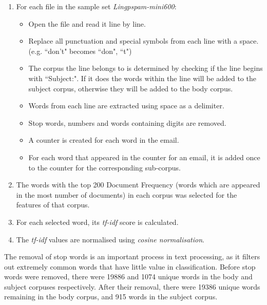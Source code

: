 \documentclass[10pt, a4paper]{article}
\begin{document}
\begin{enumerate}
\item For each file in the sample set \emph{Lingpspam-mini600}:
	\begin{itemize}
	\item Open the file and read it line by line.
	\item Replace all punctuation and special symbols from each line with a space. (e.g. ``don't" becomes ``don", ``t")
	\item The corpus the line belongs to is determined by checking if the line begins with ``Subject:". If it does the words within the line will be added to the subject corpus, otherwise they will be added to the body corpus.
	\item Words from each line are extracted using space as a delimiter.
	\item Stop words, numbers and words containing digits are removed.
	\item A counter is created for each word in the email.
	\item For each word that appeared in the counter for an email, it is added once to the counter for the corresponding sub-corpus.
	\end{itemize}
\item The words with the top 200 Document Frequency (words which are appeared in the most number of documents) in each corpus was selected for the features of that corpus.
\item For each selected word, its \emph{tf-idf} score is calculated.
\item The \emph{tf-idf} values are normalised using \emph{cosine normalisation}.
\end{enumerate}


The removal of stop words is an important process in text processing, as it filters out extremely common words that have little value in classification. Before stop words were removed, there were 19886 and 1074 unique words in the body and subject corpuses respectively. After their removal, there were 19386 unique words remaining in the body corpus, and 915 words in the subject corpus.



\end{document}
